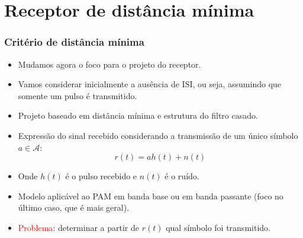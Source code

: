 \section{Receptor de distância mínima}

\begin{frame}
	\frametitle{Critério de distância mínima}

	\begin{itemize}
	    \item Mudamos agora o foco para o projeto do receptor.
	    \item Vamos considerar inicialmente a ausência de ISI, ou seja, assumindo que somente um pulso  é transmitido.
	    \item Projeto baseado em distância mínima e estrutura do filtro casado.
	    \item Expressão do sinal recebido considerando a transmissão de um único símbolo $a \in \mathcal{A}$:
	    \begin{equation*}
		r(t) = ah(t) + n(t)
	    \end{equation*}
	    \item Onde $h(t)$ é o pulso recebido e $n(t)$ é o ruído.
	    \item Modelo aplicável ao PAM em banda base ou em banda passante (foco no último caso, que é mais geral).
	    \item \textcolor{red}{Problema}: determinar a partir de $r(t)$ qual símbolo foi transmitido.
	\end{itemize}	
\end{frame}

